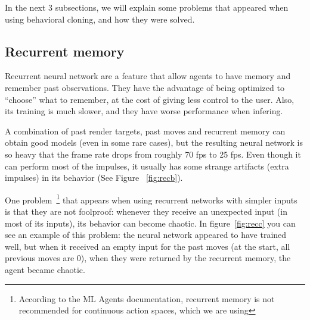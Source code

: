 In the next 3 subsections, we will explain some problems that appeared when using behavioral cloning, and how they were solved.

\subsection{Recurrent memory} %

Recurrent neural network are a feature that allow agents to have memory and remember past observations. They have the advantage of being optimized to ``choose'' what to remember, at the cost of giving less control to the user. Also, its training is much slower, and they have worse performance when infering.

A combination of past render targets, past moves and recurrent memory can obtain good models (even in some rare cases), but the resulting neural network is so heavy that the frame rate drops from roughly 70 fps to 25 fps. Even though it can perform most of the impulses, it usually has some strange artifacts (extra impulses) in its behavior (See Figure ~\ref{fig:recb}).

One problem~\footnote{According to the ML Agents documentation, recurrent memory is not recommended for continuous action spaces, which we are using} that appears when using recurrent networks with simpler inputs is that they are not foolproof: whenever they receive an unexpected input (in most of its inputs), its behavior can become chaotic. In figure~\ref{fig:recc} you can see an example of this problem: the neural network appeared to have trained well, but when it received an empty input for the past moves (at the start, all previous moves are 0), when they were returned by the recurrent memory, the agent became chaotic.

